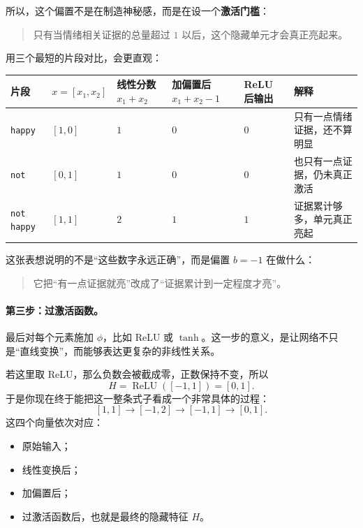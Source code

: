 \documentclass[12pt,a4paper]{ctexart}
\begin{document}
所以，这个偏置不是在制造神秘感，而是在设一个\textbf{激活门槛}：
\begin{quote}
只有当情绪相关证据的总量超过 \(1\) 以后，这个隐藏单元才会真正亮起来。
\end{quote}

用三个最短的片段对比，会更直观：

\begin{center}
\setlength{\tabcolsep}{4pt}
\begin{tabular}{>{\raggedright\arraybackslash}p{2.2cm}
                >{\centering\arraybackslash}p{2.2cm}
                >{\centering\arraybackslash}p{2.2cm}
                >{\centering\arraybackslash}p{2.6cm}
                >{\centering\arraybackslash}p{1.8cm}
                >{\raggedright\arraybackslash}p{4.0cm}}
\toprule
片段 & \(x=[x_1,x_2]\) & 线性分数 \(x_1+x_2\) & 加偏置后 \(x_1+x_2-1\) & ReLU 后输出 & 解释 \\
\midrule
\texttt{happy} & \([1,0]\) & \(1\) & \(0\) & \(0\) & 只有一点情绪证据，还不算明显 \\
\texttt{not} & \([0,1]\) & \(1\) & \(0\) & \(0\) & 也只有一点证据，仍未真正激活 \\
\texttt{not happy} & \([1,1]\) & \(2\) & \(1\) & \(1\) & 证据累计够多，单元真正亮起 \\
\bottomrule
\end{tabular}
\end{center}

这张表想说明的不是“这些数字永远正确”，而是偏置 \(b=-1\) 在做什么：
\begin{quote}
它把“有一点证据就亮”改成了“证据累计到一定程度才亮”。
\end{quote}

\paragraph{第三步：过激活函数。}
最后对每个元素施加 \(\phi\)，比如 ReLU 或 \(\tanh\)。这一步的意义，是让网络不只是“直线变换”，而能够表达更复杂的非线性关系。

若这里取 ReLU，那么负数会被截成零，正数保持不变，所以
\[
H = \operatorname{ReLU}([-1,1]) = [0,1].
\]
于是你现在终于能把这一整条式子看成一个非常具体的过程：
\[
[1,1]
\longrightarrow
[-1,2]
\longrightarrow
[-1,1]
\longrightarrow
[0,1].
\]
这四个向量依次对应：
\begin{itemize}
  \item 原始输入；
  \item 线性变换后；
  \item 加偏置后；
  \item 过激活函数后，也就是最终的隐藏特征 \(H\)。
\end{itemize}
\end{document}

